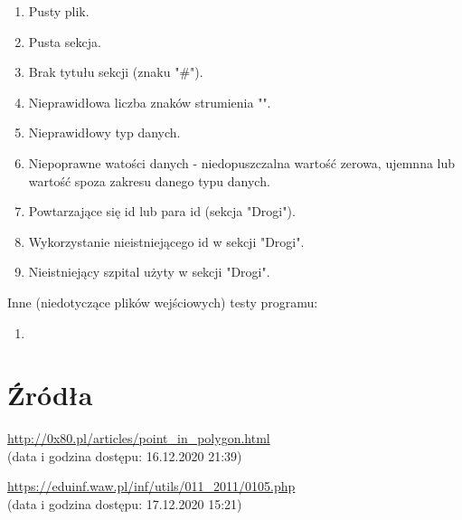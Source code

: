 \documentclass[10pt,a4paper]{article}
\begin{document}
\begin{enumerate}
    \item Pusty plik.
    \item Pusta sekcja.
    \item Brak tytułu sekcji (znaku "\#").
    \item Nieprawidłowa liczba znaków strumienia "\textbar".
    \item Nieprawidłowy typ danych.
    \item Niepoprawne watości danych - niedopuszczalna wartość zerowa, ujemnna lub wartość spoza zakresu danego typu danych.
    \item Powtarzające się id lub para id (sekcja "Drogi").
    \item Wykorzystanie nieistniejącego id w sekcji "Drogi".
    \item Nieistniejący szpital użyty w sekcji "Drogi".
\end{enumerate}

Inne (niedotyczące plików wejściowych) testy programu:
\begin{enumerate}
    \item
\end{enumerate}


\section{Źródła}

\begin{enumerate}[{[1]}]
    \item \url{http://0x80.pl/articles/point_in_polygon.html} \\(data i godzina dostępu: 16.12.2020 21:39)
    \item \url{https://eduinf.waw.pl/inf/utils/011_2011/0105.php} \\(data i godzina dostępu: 17.12.2020 15:21)
\end{enumerate}
\end{document}
